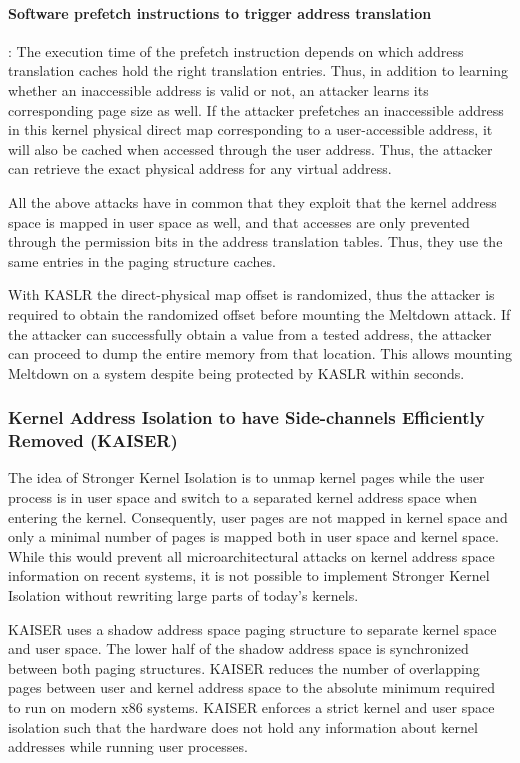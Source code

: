 \documentclass[runningheads]{llncs}
\begin{document}
\paragraph{Software prefetch instructions to trigger address translation}: The execution time of the prefetch instruction depends on which address translation caches hold the right translation entries. Thus, in addition to learning whether an inaccessible address is valid or not, an attacker learns its corresponding page size as well. If the attacker prefetches an inaccessible address in this kernel physical direct map corresponding to a user-accessible address, it will also be cached when accessed through the user address. Thus, the attacker can retrieve the exact physical address for any virtual address.

All the above attacks have in common that they exploit that the kernel address space is mapped in user space as well, and that accesses are only prevented through the permission bits in the address translation tables. Thus, they use the same entries in the paging structure caches.

With KASLR the direct-physical map offset is randomized, thus the attacker is required to obtain the randomized offset before mounting the Meltdown attack. If the attacker can successfully obtain a value from a tested address, the attacker can proceed to dump the entire memory from that location. This allows mounting Meltdown on a system despite being protected by KASLR within seconds.

\subsubsection{Kernel Address Isolation to have Side-channels Efficiently Removed (KAISER)}
The idea of Stronger Kernel  Isolation is to unmap kernel pages while the user process is in user space and switch to a separated kernel address space when entering the kernel. Consequently, user pages are not mapped in kernel space and only a minimal number of pages is mapped both in user space and kernel space. While this would prevent all microarchitectural attacks on kernel address space information on recent systems, it is not possible to implement Stronger Kernel Isolation without rewriting large parts of today’s kernels.
	
KAISER uses a shadow address space paging structure to separate kernel space and user space. The lower half of the shadow address space is synchronized between both paging structures. KAISER reduces the number of overlapping pages between user and kernel address space to the absolute minimum required to run on modern x86 systems. KAISER enforces a strict kernel and user space isolation such that the hardware does not hold any information about kernel addresses while running user processes.
\end{document}
